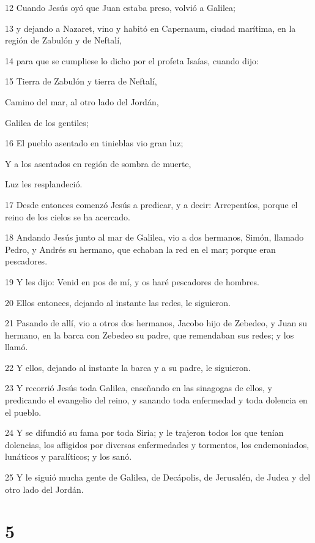 \par 12 Cuando Jesús oyó que Juan estaba preso, volvió a Galilea;
\par 13 y dejando a Nazaret, vino y habitó en Capernaum, ciudad marítima, en la región de Zabulón y de Neftalí,
\par 14 para que se cumpliese lo dicho por el profeta Isaías, cuando dijo:
\par 15 Tierra de Zabulón y tierra de Neftalí,
\par Camino del mar, al otro lado del Jordán,
\par Galilea de los gentiles;
\par 16 El pueblo asentado en tinieblas vio gran luz;
\par Y a los asentados en región de sombra de muerte,
\par Luz les resplandeció.
\par 17 Desde entonces comenzó Jesús a predicar, y a decir: Arrepentíos, porque el reino de los cielos se ha acercado.
\par 18 Andando Jesús junto al mar de Galilea, vio a dos hermanos, Simón, llamado Pedro, y Andrés su hermano, que echaban la red en el mar; porque eran pescadores.
\par 19 Y les dijo: Venid en pos de mí, y os haré pescadores de hombres.
\par 20 Ellos entonces, dejando al instante las redes, le siguieron.
\par 21 Pasando de allí, vio a otros dos hermanos, Jacobo hijo de Zebedeo, y Juan su hermano, en la barca con Zebedeo su padre, que remendaban sus redes; y los llamó.
\par 22 Y ellos, dejando al instante la barca y a su padre, le siguieron.
\par 23 Y recorrió Jesús toda Galilea, enseñando en las sinagogas de ellos, y predicando el evangelio del reino, y sanando toda enfermedad y toda dolencia en el pueblo.
\par 24 Y se difundió su fama por toda Siria; y le trajeron todos los que tenían dolencias, los afligidos por diversas enfermedades y tormentos, los endemoniados, lunáticos y paralíticos; y los sanó.
\par 25 Y le siguió mucha gente de Galilea, de Decápolis, de Jerusalén, de Judea y del otro lado del Jordán.

\chapter{5}


